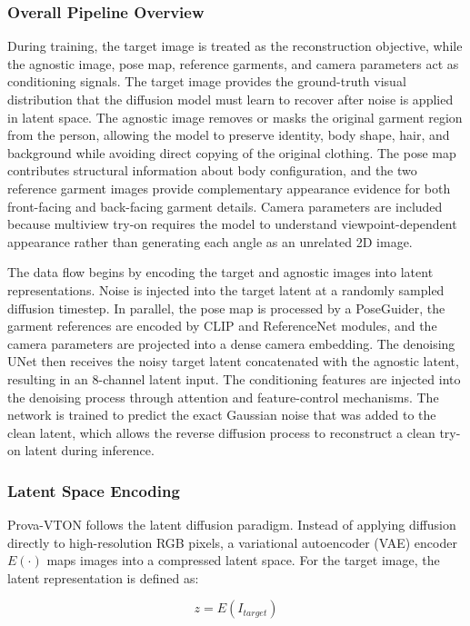 \subsubsection*{Overall Pipeline Overview}
During training, the target image is treated as the reconstruction objective, while the agnostic image, pose map, reference garments, and camera parameters act as conditioning signals. The target image provides the ground-truth visual distribution that the diffusion model must learn to recover after noise is applied in latent space. The agnostic image removes or masks the original garment region from the person, allowing the model to preserve identity, body shape, hair, and background while avoiding direct copying of the original clothing. The pose map contributes structural information about body configuration, and the two reference garment images provide complementary appearance evidence for both front-facing and back-facing garment details. Camera parameters are included because multiview try-on requires the model to understand viewpoint-dependent appearance rather than generating each angle as an unrelated 2D image.

The data flow begins by encoding the target and agnostic images into latent representations. Noise is injected into the target latent at a randomly sampled diffusion timestep. In parallel, the pose map is processed by a PoseGuider, the garment references are encoded by CLIP and ReferenceNet modules, and the camera parameters are projected into a dense camera embedding. The denoising UNet then receives the noisy target latent concatenated with the agnostic latent, resulting in an 8-channel latent input. The conditioning features are injected into the denoising process through attention and feature-control mechanisms. The network is trained to predict the exact Gaussian noise that was added to the clean latent, which allows the reverse diffusion process to reconstruct a clean try-on latent during inference.

\subsubsection*{Latent Space Encoding}
Prova-VTON follows the latent diffusion paradigm. Instead of applying diffusion directly to high-resolution RGB pixels, a variational autoencoder (VAE) encoder \(E(\cdot)\) maps images into a compressed latent space. For the target image, the latent representation is defined as:

\begin{equation}
z = E(I_{target})
\end{equation}

